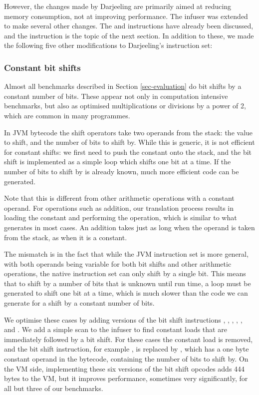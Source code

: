 However, the changes made by Darjeeling are primarily aimed at reducing memory consumption, not at improving performance. The infuser was extended to make several other changes. The  and  instructions have already been discussed, and the  instruction is the topic of the next section. In addition to these, we made the following five other modifications to Darjeeling's instruction set:

\subsubsection{Constant bit shifts}
\label{sec-opt-constant-shift}


Almost all benchmarks described in Section \ref{sec-evaluation} do bit shifts by a constant number of bits. These appear not only in computation intensive benchmarks, but also as optimised multiplications or divisions by a power of 2, which are common in many programmes.

In JVM bytecode the shift operators take two operands from the stack: the value to shift, and the number of bits to shift by. While this is generic, it is not efficient for constant shifts: we first need to push the constant onto the stack, and the bit shift is implemented as a simple loop which shifts one bit at a time. If the number of bits to shift by is already known, much more efficient code can be generated.

Note that this is different from other arithmetic operations with a constant operand. For operations such as addition, our translation process results in loading the constant and performing the operation, which is similar to what  generates in most cases. An addition takes just as long when the operand is taken from the stack, as when it is a constant. 

The mismatch is in the fact that while the JVM instruction set is more general, with both operands being variable for both bit shifts and other arithmetic operations, the native instruction set can only shift by a single bit. This means that to shift by a number of bits that is unknown until run time, a loop must be generated to shift one bit at a time, which is much slower than the code we can generate for a shift by a constant number of bits.

We optimise these cases by adding  versions of the bit shift instructions , , , , , and . We add a simple scan to the infuser to find constant loads that are immediately followed by a bit shift. For these cases the constant load is removed, and the bit shift instruction, for example , is replaced by , which has a one byte constant operand in the bytecode, containing the number of bits to shift by. On the VM side, implementing these six  versions of the bit shift opcodes adds 444 bytes to the VM, but it improves performance, sometimes very significantly, for all but three of our benchmarks.

